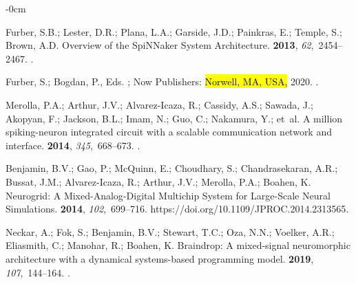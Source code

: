 \documentclass[brainsci, %
               review,accept,pdftex,moreauthors
               ]{Definitions/mdpi}
\begin{document}
\begin{adjustwidth}{-\extralength}{0cm}
\begin{thebibliography}{999}
Furber, S.B.; Lester, D.R.; Plana, L.A.; Garside, J.D.; Painkras, E.; Temple,
  S.; Brown, A.D.
\newblock Overview of the {SpiNNaker} {System} {Architecture}.
 {\bf 2013}, {\em
  62},~2454--2467.
.

Furber, S.; Bogdan, P., Eds.
;
  Now Publishers: \hl{Norwell, MA, USA,} %
  2020.
.

Merolla, P.A.; Arthur, J.V.; Alvarez-Icaza, R.; Cassidy, A.S.; Sawada, J.;
  Akopyan, F.; Jackson, B.L.; Imam, N.; Guo, C.; Nakamura, Y.;  et~al.
\newblock A million spiking-neuron integrated circuit with a scalable
  communication network and interface.
 {\bf 2014}, {\em 345},~668--673.
.

Benjamin, B.V.; Gao, P.; McQuinn, E.; Choudhary, S.; Chandrasekaran, A.R.;
  Bussat, J.M.; Alvarez-Icaza, R.; Arthur, J.V.; Merolla, P.A.; Boahen, K.
\newblock Neurogrid: {A} {Mixed}-{Analog}-{Digital} {Multichip} {System} for
  {Large}-{Scale} {Neural} {Simulations}.
 {\bf 2014}, {\em 102},~699--716.
  {{https://doi.org/10.1109/JPROC.2014.2313565}}.

Neckar, A.; Fok, S.; Benjamin, B.V.; Stewart, T.C.; Oza, N.N.; Voelker, A.R.;
  Eliasmith, C.; Manohar, R.; Boahen, K.
\newblock Braindrop: {A} mixed-signal neuromorphic architecture with a
  dynamical systems-based programming model.
 {\bf 2019}, {\em 107},~144--164.
.


\end{thebibliography}
\end{adjustwidth}
\end{document}
